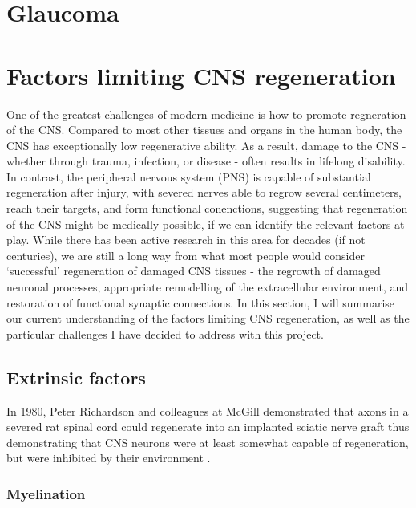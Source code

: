 \documentclass[
]{book}
\begin{document}

\hypertarget{glaucoma}{%
\section{Glaucoma}\label{glaucoma}}

\hypertarget{factors-limiting-cns-regeneration}{%
\section{Factors limiting CNS regeneration}\label{factors-limiting-cns-regeneration}}

One of the greatest challenges of modern medicine is how to promote regneration of the CNS. Compared to most other tissues and organs in the human body, the CNS has exceptionally low regenerative ability. As a result, damage to the CNS - whether through trauma, infection, or disease - often results in lifelong disability. In contrast, the peripheral nervous system (PNS) is capable of substantial regeneration after injury, with severed nerves able to regrow several centimeters, reach their targets, and form functional conenctions, suggesting that regeneration of the CNS might be medically possible, if we can identify the relevant factors at play. While there has been active research in this area for decades (if not centuries), we are still a long way from what most people would consider `successful' regeneration of damaged CNS tissues - the regrowth of damaged neuronal processes, appropriate remodelling of the extracellular environment, and restoration of functional synaptic connections. In this section, I will summarise our current understanding of the factors limiting CNS regeneration, as well as the particular challenges I have decided to address with this project.

\hypertarget{extrinsic-factors}{%
\subsection{Extrinsic factors}\label{extrinsic-factors}}

In 1980, Peter Richardson and colleagues at McGill demonstrated that axons in a severed rat spinal cord could regenerate into an implanted sciatic nerve graft thus demonstrating that CNS neurons were at least somewhat capable of regeneration, but were inhibited by their environment \citep{richardsonAxonsCNSNeurones1980}.

\hypertarget{myelination}{%
\subsubsection{Myelination}\label{myelination}}
\end{document}
